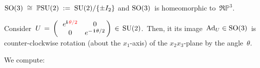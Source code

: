 
\vskip 0.5cm
\noindent
\begin{corollary}
\mbox{}
\vskip 0.05cm
\noindent
$\textnormal{SO}(3) \;\cong\; \mathbb{P}\textnormal{SU}(2) \;:=\; \textnormal{SU}(2)/\{\pm I_{2}\}$
\; and \;
$\textnormal{SO}(3)$\, is homeomorphic to \,$\Re\mathbb{P}^{3}$.\,
\end{corollary}


\vskip 0.5cm
\begin{remark}
\mbox{}
\vskip 0.1cm
\noindent
Consider
\,$U \, = \, \left(\,\begin{array}{cc} e^{\textnormal{\bf i}\,{\color{red}\theta/2}} & 0 \\ 0 & e^{-\,\textnormal{\bf i}\,\theta/2} \end{array}\!\!\right) \,\in\, \textnormal{SU}(2)$.\,
Then, it its image
\,$\textnormal{Ad}_{U} \in \textnormal{SO}(3)$\,
is counter-clockwise rotation (about the $x_{1}$-axis) of the $x_{2}x_{3}$-plane by the angle \,{\color{red}$\theta$}.\,
\end{remark}
\proof
We compute:
